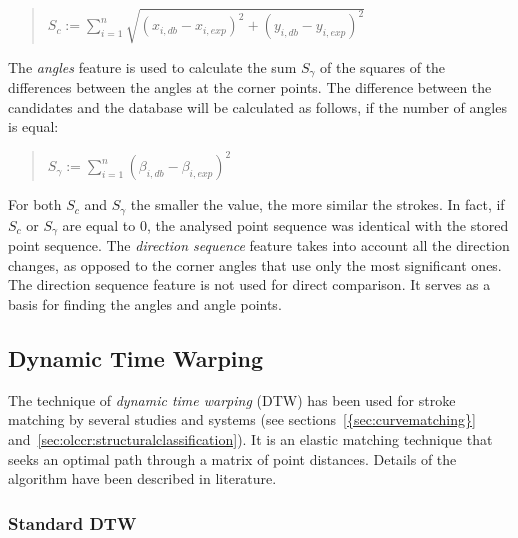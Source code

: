 \begin{quote}
\(
  S_c := \sum\limits_{i=1}^{n} \sqrt{(x_{i,db}-x_{i,exp})^2+(y_{i,db}-y_{i,exp})^2} %
\)
\end{quote}
The \emph{angles} feature is used to calculate the sum \(S_{\gamma}\) 
of the squares of the differences between the angles at the corner points. 
The difference between the candidates and the database will be calculated 
as follows, if the number of angles is equal:
\begin{quote}
\(
  S_{\gamma} := \sum\limits_{i=1}^{n} (\beta_{i,db}-\beta_{i,exp})^2
\)
\end{quote}
For both \( S_{c} \) and \( S_{\gamma} \) the smaller the value, 
the more similar the strokes. 
In fact, if \( S_{c} \) or \( S_{\gamma} \) are equal to \(0\),
the analysed point sequence was identical with the stored point sequence.
The \emph{direction sequence} feature takes into account all the direction 
changes, as opposed to the corner angles that use only the most significant ones.
The direction sequence feature is not used for direct comparison. It serves as
a basis for finding the angles and angle points.
%

\subsection{Dynamic Time Warping}
\label{sec:hwre:dynamictimewarping}

The technique of \emph{dynamic time warping} (DTW) has been used for stroke 
matching by several studies and systems (see sections~\ref{{sec:curvematching}} 
and~\ref{sec:olccr:structuralclassification}).
It is an elastic matching technique that seeks an optimal path through
a matrix of point distances. Details of the algorithm have been described
in literature.

\subsubsection{Standard DTW}
\label{sec:hwre:standarddtw}

